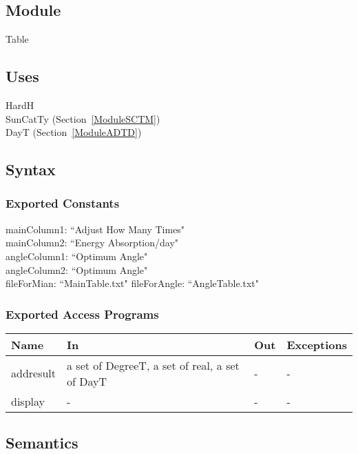 \documentclass[12pt, titlepage]{article}
\begin{document}
\subsection{Module}
Table\\

\subsection{Uses}
HardH\\
SunCatTy (Section~\ref{ModuleSCTM}) \\
DayT (Section~\ref{ModuleADTD}) \\

\subsection{Syntax}

\subsubsection{Exported Constants}

mainColumn1:  ``Adjust How Many Times"\\
mainColumn2: ``Energy Absorption/day"\\
angleColumn1: ``Optimum Angle" \\
angleColumn2: ``Optimum Angle" \\
fileForMian: ``MainTable.txt"
fileForAngle: ``AngleTable.txt"

\subsubsection{Exported Access Programs}

\begin{center}
\begin{tabular}{p{2cm} p{5cm} p{5cm} p{2cm}}
\hline
\textbf{Name} & \textbf{In} & \textbf{Out} & \textbf{Exceptions} \\
\hline 
addresult &  a set of DegreeT, a set of real, a set of DayT & - & - \\
display & - & - & - \\

\hline
\end{tabular}
\end{center}


\subsection{Semantics}
\end{document}

